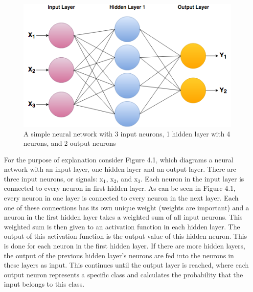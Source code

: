 \documentclass[12pt]{report} %
\begin{document}
\begin{figure}
\centering
\includegraphics[width=5in]{NeuralNetwork}
\caption{A simple neural network with 3 input neurons, 1 hidden layer with 4 neurons, and 2 output neurons}
\end{figure}
	For the purpose of explanation consider Figure 4.1, which diagrams a neural network with an input layer, one hidden layer and an output layer. There are three input neurons, or signals: x$_{1}$, x$_{2}$, and x$_{3}$. Each neuron in the input layer is connected to every neuron in first hidden layer. As can be seen in Figure 4.1, every neuron in one layer is connected to every neuron in the next layer. Each one of these connections has its own unique weight (weights are important) and a neuron in the first hidden layer takes a weighted sum of all input neurons. This weighted sum is then given to an activation function in each hidden layer. The output of this activation function is the output value of this hidden neuron. This is done for each neuron in the first hidden layer. If there are more hidden layers, the output of the previous hidden layer's neurons are fed into the neurons in these layers as input. This continues until the output layer is reached, where each output neuron represents a specific class and calculates the probability that the input belongs to this class.\cite{KubatMachineLearn}
	
\end{document}

